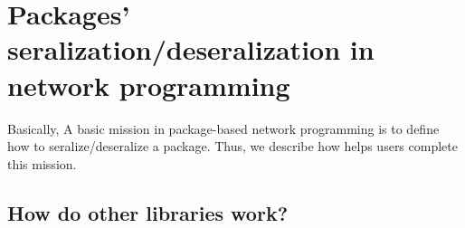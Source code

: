 \section{Packages' seralization/deseralization in network programming}

Basically, A basic mission in package-based network programming is to define how to seralize/deseralize a package. Thus, we describe how {\ffnet} helps users complete this mission.

\subsection{How do other libraries work?}

